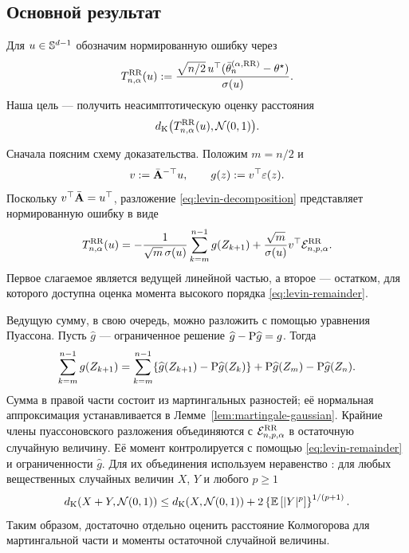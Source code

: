 \subsection*{Основной результат}

Для $u\in\mathbb{S}^{d-1}$ обозначим нормированную ошибку через
\[
 T_{n,\alpha}^{\mathrm{RR}}(u)
 :=\frac{\sqrt{n/2}\,u^\top
 (\bar{\theta}_n^{(\alpha,\mathrm{RR})}-\theta^\star)}{\sigma(u)}.
\]
Наша цель --- получить неасимптотическую оценку расстояния
\[
 d_{\mathrm K}\bigl(T_{n,\alpha}^{\mathrm{RR}}(u),\mathcal{N}(0,1)\bigr).
\]

Сначала поясним схему доказательства. Положим $m=n/2$ и
\[
 v:=\bar{\mathbf{A}}^{-\top}u,
 \qquad g(z):=v^\top\varepsilon(z).
\]
Поскольку $v^\top\bar{\mathbf{A}}=u^\top$, разложение
\eqref{eq:levin-decomposition} представляет нормированную ошибку в виде
\begin{equation}
  \label{eq:T_RR}
 T_{n,\alpha}^{\mathrm{RR}}(u)
 =-\frac1{\sqrt m\,\sigma(u)}
   \sum_{k=m}^{n-1}g(Z_{k+1})
 +\frac{\sqrt m}{\sigma(u)}
   v^\top\mathcal{E}_{n,p,\alpha}^{\mathrm{RR}}.
\end{equation}
Первое слагаемое является ведущей линейной частью, а второе --- остатком,
для которого доступна оценка момента высокого порядка
\eqref{eq:levin-remainder}.

Ведущую сумму, в свою очередь, можно разложить с помощью уравнения Пуассона.
Пусть $\widehat g$ --- ограниченное решение
$\widehat g-\mathrm{P}\widehat g=g$. Тогда
\begin{equation}
  \label{eq:poisson}
 \sum_{k=m}^{n-1}g(Z_{k+1})
 =\sum_{k=m}^{n-1}
   \{\widehat g(Z_{k+1})-\mathrm{P}\widehat g(Z_k)\}
 +\mathrm{P}\widehat g(Z_m)-\mathrm{P}\widehat g(Z_n).
\end{equation}
Сумма в правой части состоит из мартингальных разностей; её нормальная
аппроксимация устанавливается в Лемме~\ref{lem:martingale-gaussian}. Крайние
члены пуассоновского разложения объединяются с
$\mathcal{E}_{n,p,\alpha}^{\mathrm{RR}}$ в остаточную случайную величину. Её момент
контролируется с помощью \eqref{eq:levin-remainder} и ограниченности
$\widehat g$. Для их объединения используем неравенство
\cite[(11)]{Samsonov2025}: для любых вещественных случайных величин $X$, $Y$
и любого $p\geq1$
\begin{equation}\label{eq:smoothing-inequality}
 d_{\mathrm K}\!\left(X+Y,\mathcal{N}(0,1)\right)
 \leq d_{\mathrm K}\!\left(X,\mathcal{N}(0,1)\right)
 +2\left\{\mathbb{E}\left[\vert Y\vert^p\right]\right\}^{1/(p+1)}.
\end{equation}
Таким образом, достаточно отдельно оценить расстояние Колмогорова для
мартингальной части и моменты остаточной случайной величины.

